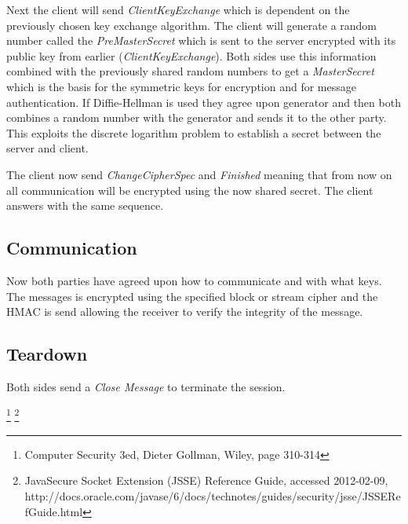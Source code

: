 \documentclass[10pt, a4paper]{article}
\begin{document}
Next the client will send \emph{ClientKeyExchange} which is dependent on the previously chosen key exchange algorithm. The client will generate a random number called the \emph{PreMasterSecret} which is sent to the server encrypted with its public key from earlier (\emph{ClientKeyExchange}). Both sides use this information combined with the previously shared random numbers to get a \emph{MasterSecret} which is the basis for the symmetric keys for encryption and for message authentication. If Diffie-Hellman is used they agree upon generator and then both combines a random number with the generator and sends it to the other party. This exploits the discrete logarithm problem to establish a secret between the server and client. %

The client now send \emph{ChangeCipherSpec} and \emph{Finished} meaning that from now on all communication will be encrypted using the now shared secret. The client answers with the same sequence.

\subsection{Communication}
Now both parties have agreed upon how to communicate and with what keys. The messages is encrypted using the specified block or stream cipher and the HMAC is send allowing the receiver to verify the integrity of the message.

\subsection{Teardown}
Both sides send a \emph{Close Message} to terminate the session.


\footnote{Computer Security 3ed, Dieter Gollman, Wiley, page 310-314}
\footnote{Java\textregistered Secure Socket Extension (JSSE) Reference Guide, accessed 2012-02-09, http://docs.oracle.com/javase/6/docs/technotes/guides/security/jsse/JSSERefGuide.html}
\end{document}
